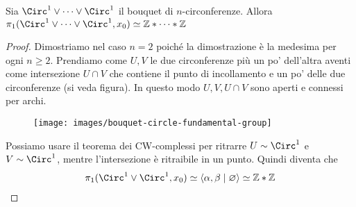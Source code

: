 \begin{xca}
	Sia $\Circ^1 \lor \dots \lor \Circ^1$ il bouquet di $n$-circonferenze. Allora $\pi_1(\Circ^1 \lor \dots \lor \Circ^1, x_0) \simeq \Z \ast \dots \ast \Z$
\end{xca}
\begin{proof}
	Dimostriamo nel caso $n=2$ poiché la dimostrazione è la medesima per ogni $n \ge 2$. Prendiamo come $U, V$ le due circonferenze più un po' dell'altra aventi come intersezione $U \cap V$ che contiene il punto di incollamento e un po' delle due circonferenze (si veda figura). In questo modo $U,V,U \cap V$ sono aperti e connessi per archi.
	\begin{figure}[h]
		\centering
		\texttt{[image: images/bouquet-circle-fundamental-group]}
		\caption{}
		\label{fig:bouquet-circle-fundamental-group}
	\end{figure}
	Possiamo usare il teorema dei CW-complessi per ritrarre $U \sim \Circ^1$ e $V \sim \Circ^1$, mentre l'intersezione è ritraibile in un punto. Quindi diventa che 
	\begin{equation}
	\begin{aligned}
		\pi_1(\Circ^1 \lor \Circ^1, x_0) \simeq \left\langle \alpha, \beta \mid \varnothing \right\rangle \simeq \Z \ast \Z
	\end{aligned}
	\end{equation}
\end{proof}


